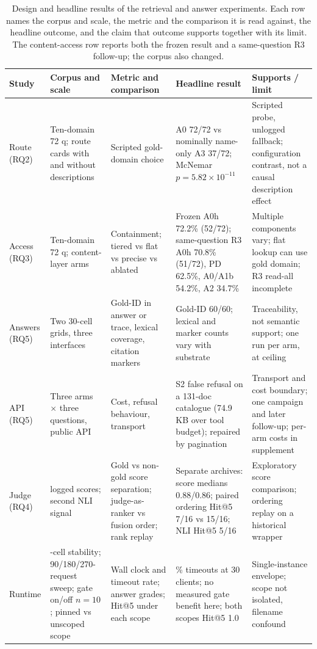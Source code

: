 \documentclass[final,5p,times,twocolumn]{elsarticle}
\begin{document}
\begin{table}[t]
\centering
\footnotesize
\setlength{\tabcolsep}{4pt}
\caption{Design and headline results of the retrieval and answer experiments.
Each row names the corpus and scale, the metric and the comparison it is read
against, the headline outcome, and the claim that outcome supports together
with its limit. The content-access row reports both the frozen result and a same-question R3 follow-up; the corpus also changed.}
\label{tab:retrieval-design}
\begin{tabular}{@{}>{\raggedright\arraybackslash}p{}>{\raggedright\arraybackslash}p{}>{\raggedright\arraybackslash}p{}>{\raggedright\arraybackslash}p{}>{\raggedright\arraybackslash}p{}@{}}
\toprule
Study & Corpus and scale & Metric and comparison & Headline result & Supports / limit\\
\midrule
Route (RQ2) & Ten-domain 72 q; route cards with and without descriptions & Scripted gold-domain choice & A0 72/72 vs nominally name-only A3 37/72; McNemar $p=5.82\times10^{-11}$ & Scripted probe, unlogged fallback; configuration contrast, not a causal description effect\\
Access (RQ3) & Ten-domain 72 q; content-layer arms & Containment; tiered vs flat vs precise vs ablated & Frozen A0h 72.2\% (52/72); same-question R3 A0h 70.8\% (51/72), PD 62.5\%, A0/A1b 54.2\%, A2 34.7\% & Multiple components vary; flat lookup can use gold domain; R3 read-all incomplete\\
Answers (RQ5) & Two 30-cell grids, three interfaces & Gold-ID in answer or trace, lexical coverage, citation markers & Gold-ID 60/60; lexical and marker counts vary with substrate & Traceability, not semantic support; one run per arm, at ceiling\\
API (RQ5) & Three arms $\times$ three questions, public API & Cost, refusal behaviour, transport & S2 false refusal on a 131-doc catalogue (74.9\,KB over tool budget); repaired by pagination & Transport and cost boundary; one campaign and later follow-up; per-arm costs in supplement\\
Judge (RQ4) & 191 logged scores; second NLI signal & Gold vs non-gold score separation; judge-as-ranker vs fusion order; rank replay & Separate archives: score medians 0.88/0.86; paired ordering Hit@5 7/16 vs 15/16; NLI Hit@5 5/16 & Exploratory score comparison; ordering replay on a historical wrapper\\
Runtime & 27-cell stability; 90/180/270-request sweep; gate on/off $n=10$; pinned vs unscoped scope & Wall clock and timeout rate; answer grades; Hit@5 under each scope & 41\% timeouts at 30 clients; no measured gate benefit here; both scopes Hit@5 1.0 & Single-instance envelope; scope not isolated, filename confound\\
\bottomrule
\end{tabular}
\end{table}
\end{document}
